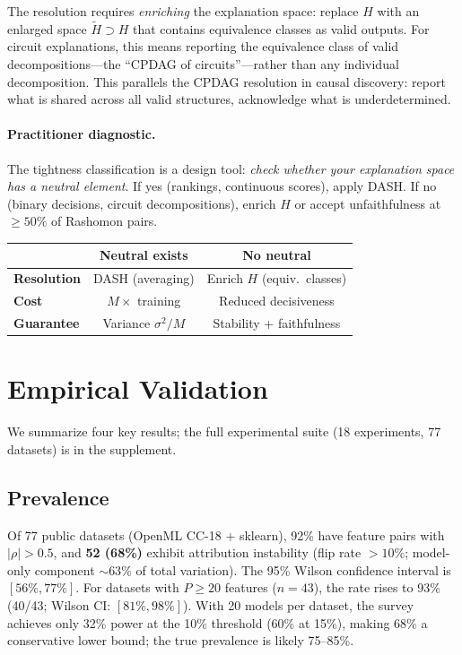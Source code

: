 The resolution requires \emph{enriching} the explanation space: replace $H$ with an enlarged space $\tilde{H} \supset H$ that contains equivalence classes as valid outputs. For circuit explanations, this means reporting the equivalence class of valid decompositions---the ``CPDAG of circuits''---rather than any individual decomposition. This parallels the CPDAG resolution in causal discovery: report what is shared across all valid structures, acknowledge what is underdetermined.

\paragraph{Practitioner diagnostic.}
The tightness classification is a design tool: \emph{check whether your explanation space has a neutral element}. If yes (rankings, continuous scores), apply DASH. If no (binary decisions, circuit decompositions), enrich $H$ or accept unfaithfulness at $\geq 50\%$ of Rashomon pairs.

\begin{center}
\small
\begin{tabular}{l|cc}
 & Neutral exists & No neutral \\
\hline
\textbf{Resolution} & DASH (averaging) & Enrich $H$ (equiv.\ classes) \\
\textbf{Cost} & $M \times$ training & Reduced decisiveness \\
\textbf{Guarantee} & Variance $\sigma^2/M$ & Stability + faithfulness \\
\end{tabular}
\end{center}



\section{Empirical Validation}
\label{sec:experiments}

We summarize four key results; the full experimental suite (18 experiments, 77 datasets) is in the supplement.

\subsection{Prevalence}

Of 77 public datasets (OpenML CC-18 + sklearn), 92\% have feature pairs with $|\rho| > 0.5$, and \textbf{52 (68\%)} exhibit attribution instability (flip rate $> 10\%$; model-only component ${\sim}63\%$ of total variation). The 95\% Wilson confidence interval is $[56\%, 77\%]$. For datasets with $P \geq 20$ features ($n = 43$), the rate rises to 93\% (40/43; Wilson CI: $[81\%, 98\%]$). With 20 models per dataset, the survey achieves only 32\% power at the 10\% threshold (60\% at 15\%), making 68\% a conservative lower bound; the true prevalence is likely 75--85\%.

